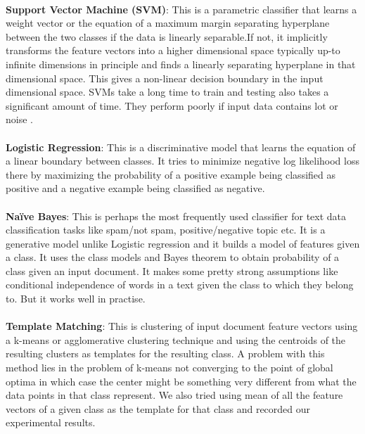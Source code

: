 \documentclass[a4paper,26pt]{article}
\begin{document}
\paragraph{}
\textbf{Support Vector Machine (SVM)}: This is a parametric classifier that learns a weight vector or the equation of a maximum margin separating hyperplane between the two classes if the data is linearly separable.If not, it implicitly transforms the feature vectors into a higher dimensional space typically up-to infinite dimensions in principle and finds a linearly separating hyperplane in that dimensional space. This gives a non-linear decision boundary in the input dimensional space. SVMs take a long time to train and testing also takes a significant amount of time. They perform poorly if input data contains lot or noise . 
\paragraph{}
\textbf{Logistic Regression}: This is a discriminative model that learns the equation of a linear boundary between classes. It tries to minimize negative log likelihood loss there by maximizing the probability of a positive example being classified as positive and a negative example being classified as negative.   

\paragraph{}
\textbf{Na\"{i}ve Bayes}: This is perhaps the most frequently used classifier for text data classification tasks like spam/not spam, positive/negative topic etc. It is a generative model unlike Logistic regression and it builds a model of features given a class. It uses the class models and Bayes theorem to obtain probability of a class given an input document. It makes some pretty strong assumptions like conditional independence of words in a text given the class to which they belong to. But it works well in practise.  

\paragraph{}
\textbf{Template Matching}: This is clustering of input document feature vectors using a k-means or agglomerative clustering technique and using the centroids of the resulting clusters as templates for the resulting class. A problem with this method lies in the problem of k-means not converging to the point of global optima in which case the center might be something very different from what the data points in that class represent. We also tried using mean of all the feature vectors of a given class as the template for that class and recorded our experimental results.   
\end{document}
